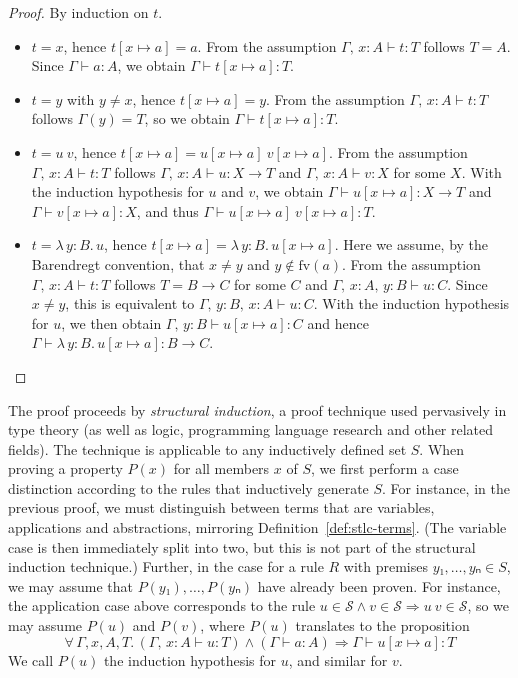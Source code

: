 \documentclass{article}
\theoremstyle{definition}
\newcommand{\Terms}{\mathcal{S}}
\newcommand{\fv}{\mathrm{fv}}
\newcommand{\Lam}[2]{λ\,#1.\, #2}
\begin{document}
\begin{proof}
  By induction on $t$.
  \begin{itemize}
    \item $t = x$, hence $t[x ↦ a] = a$.
          From the assumption $Γ,\, x : A ⊢ t : T$ follows $T = A$.
          Since $Γ ⊢ a : A$, we obtain $Γ ⊢ t[x ↦ a] : T$.
    \item $t = y$ with $y ≠ x$, hence $t[x ↦ a] = y$.
          From the assumption $Γ,\, x : A ⊢ t : T$ follows $Γ(y) = T$, so we obtain $Γ ⊢ t[x ↦ a] : T$.
    \item $t = u~v$, hence $t[x ↦ a] = u[x ↦ a]~v[x ↦ a]$.
          From the assumption $Γ,\, x : A ⊢ t : T$ follows $Γ,\, x : A ⊢ u : X → T$ and $Γ,\, x : A ⊢ v : X$ for some $X$.
          With the induction hypothesis for $u$ and $v$, we obtain $Γ ⊢ u[x ↦ a] : X → T$ and $Γ ⊢ v[x ↦ a] : X$, and thus $Γ ⊢ u[x ↦ a]~v[x ↦ a] : T$.
    \item $t = \Lam{y : B}{u}$, hence $t[x ↦ a] = \Lam{y : B}{u[x ↦ a]}$.
          Here we assume, by the Barendregt convention, that $x ≠ y$ and $y ∉ \fv(a)$.
          From the assumption $Γ,\, x : A ⊢ t : T$ follows $T = B → C$ for some $C$ and $Γ,\, x : A,\, y : B ⊢ u : C$.
          Since $x ≠ y$, this is equivalent to $Γ,\, y : B,\, x : A ⊢ u : C$.
          With the induction hypothesis for $u$, we then obtain $Γ,\, y : B ⊢ u[x ↦ a] : C$ and hence $Γ ⊢ \Lam{y : B}{u[x ↦ a]} : B → C$.
  \end{itemize}
\end{proof}

The proof proceeds by \emph{structural induction}, a proof technique used pervasively in type theory (as well as logic, programming language research and other related fields).
The technique is applicable to any inductively defined set $S$.
When proving a property $P(x)$ for all members $x$ of $S$, we first perform a case distinction according to the rules that inductively generate $S$.
For instance, in the previous proof, we must distinguish between terms that are variables, applications and abstractions, mirroring Definition~\ref{def:stlc-terms}.
(The variable case is then immediately split into two, but this is not part of the structural induction technique.)
Further, in the case for a rule $R$ with premises $y₁, \dots, yₙ ∈ S$, we may assume that $P(y₁), \dots, P(yₙ)$ have already been proven.
For instance, the application case above corresponds to the rule $u ∈ \Terms ∧ v ∈ \Terms ⇒ u~v ∈ \Terms$, so we may assume $P(u)$ and $P(v)$, where $P(u)$ translates to the proposition
\[
  ∀\, Γ, x, A, T.\, (Γ,\, x : A ⊢ u : T) ∧ (Γ ⊢ a : A) ⇒ Γ ⊢ u[x ↦ a] : T
\]
We call $P(u)$ the induction hypothesis for $u$, and similar for $v$.
\end{document}
